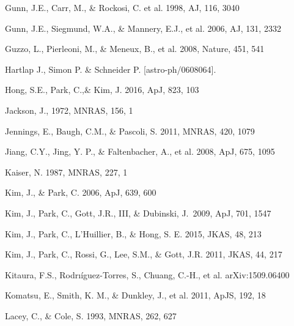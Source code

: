 \documentclass[prl,twocolumn,superscriptaddress,aps,amsmath,amssymb,nofootinbib,altaffilletter]{revtex4}
\begin{document}
\begin{thebibliography}{}


Gunn, J.E., Carr, M., \& Rockosi, C. et al. 1998, AJ, 116, 3040

Gunn, J.E., Siegmund, W.A., \& Mannery, E.J., et al. 2006, AJ, 131, 2332

Guzzo, L., Pierleoni, M., \& Meneux, B., et al. 2008, Nature, 451, 541

Hartlap J., Simon P. \& Schneider P. [astro-ph/0608064].


Hong, S.E., Park, C.,\&  Kim, J. 2016, ApJ, 823, 103

Jackson, J., 1972, MNRAS, 156, 1

Jennings, E., Baugh, C.M., \& Pascoli, S. 2011, MNRAS, 420, 1079  


Jiang, C.Y., Jing, Y. P., \& Faltenbacher, A., et al. 2008, ApJ, 675, 1095

Kaiser, N. 1987, MNRAS, 227, 1


Kim, J., \& Park, C. 2006, ApJ, 639, 600  

Kim, J., Park, C., Gott, J.R., III, \& Dubinski, J.\ 2009, ApJ, 701, 1547 

Kim, J., Park, C., L'Huillier, B., \& Hong, S. E. 2015, JKAS, 48, 213

Kim, J., Park, C., Rossi, G., Lee, S.M., \& Gott, J.R. 2011, JKAS, 44, 217  

Kitaura, F.S., Rodrı\'{i}guez-Torres, S., Chuang, C.-H., et al. arXiv:1509.06400

Komatsu, E., Smith, K. M., \& Dunkley, J., et al. 2011, ApJS, 192, 18  

Lacey, C., \& Cole, S. 1993, MNRAS, 262, 627



\end{thebibliography}
\end{document}
